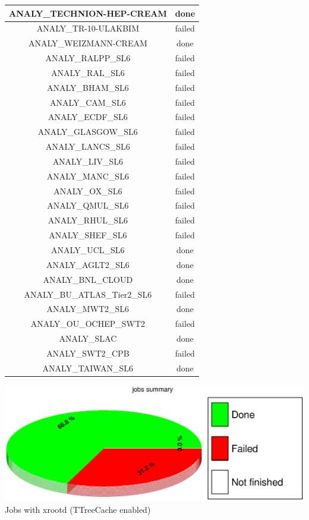 \begin{longtable}{|c|c|}
	\hline
	\color{black}ANALY\_TECHNION-HEP-CREAM & \color{green}done \\
	\hline
	\color{black}ANALY\_TR-10-ULAKBIM & \color{red}failed \\
	\hline
	\color{black}ANALY\_WEIZMANN-CREAM & \color{green}done \\
	\hline
	\color{black}ANALY\_RALPP\_SL6 & \color{red}failed \\
	\hline
	\color{black}ANALY\_RAL\_SL6 & \color{red}failed \\
	\hline
	\color{black}ANALY\_BHAM\_SL6 & \color{red}failed \\
	\hline
	\color{black}ANALY\_CAM\_SL6 & \color{red}failed \\
	\hline
	\color{black}ANALY\_ECDF\_SL6 & \color{red}failed \\
	\hline
	\color{black}ANALY\_GLASGOW\_SL6 & \color{red}failed \\
	\hline
	\color{black}ANALY\_LANCS\_SL6 & \color{red}failed \\
	\hline
	\color{black}ANALY\_LIV\_SL6 & \color{red}failed \\
	\hline
	\color{black}ANALY\_MANC\_SL6 & \color{red}failed \\
	\hline
	\color{black}ANALY\_OX\_SL6 & \color{red}failed \\
	\hline
	\color{black}ANALY\_QMUL\_SL6 & \color{red}failed \\
	\hline
	\color{black}ANALY\_RHUL\_SL6 & \color{red}failed \\
	\hline
	\color{black}ANALY\_SHEF\_SL6 & \color{red}failed \\
	\hline
	\color{black}ANALY\_UCL\_SL6 & \color{green}done \\
	\hline
	\color{black}ANALY\_AGLT2\_SL6 & \color{green}done \\
	\hline
	\color{black}ANALY\_BNL\_CLOUD & \color{green}done \\
	\hline
	\color{black}ANALY\_BU\_ATLAS\_Tier2\_SL6 & \color{red}failed \\
	\hline
	\color{black}ANALY\_MWT2\_SL6 & \color{green}done \\
	\hline
	\color{black}ANALY\_OU\_OCHEP\_SWT2 & \color{red}failed \\
	\hline
	\color{black}ANALY\_SLAC & \color{green}done \\
	\hline
	\color{black}ANALY\_SWT2\_CPB & \color{red}failed \\
	\hline
	\color{black}ANALY\_TAIWAN\_SL6 & \color{green}done \\
\hline

\end{longtable}
\includegraphics[width=\textwidth]{../PieChart/job/tcanvas.eps}
Jobs with xrootd (TTreeCache enabled) 

